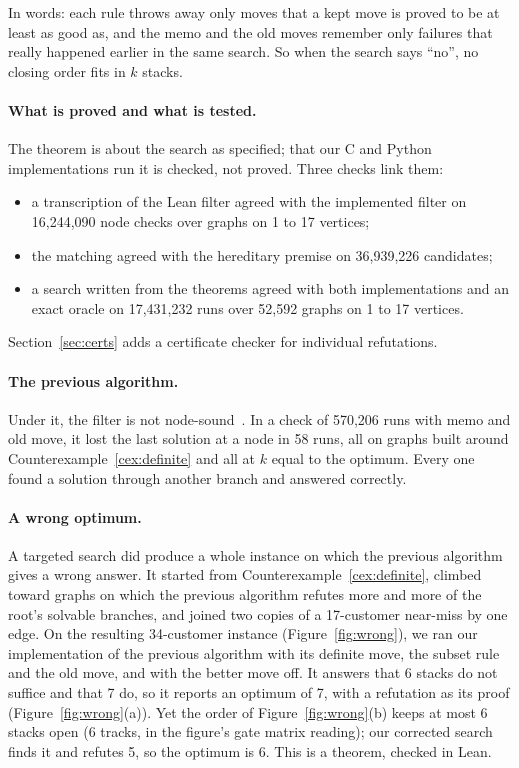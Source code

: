 In words: each rule throws away only moves that a kept move is proved to be at
least as good as, and the memo and the old moves remember only failures that
really happened earlier in the same search. So when the search says ``no'',
no closing order fits in $k$ stacks.

\paragraph{What is proved and what is tested.} The theorem is about the search
as specified; that our C and Python implementations run it is checked, not
proved. Three checks link them:
\begin{itemize}
\item a transcription of the Lean filter agreed with the implemented filter on
  16,244,090 node checks over graphs on 1 to 17 vertices;
\item the matching agreed with the hereditary premise on 36,939,226 candidates;
\item a search written from the theorems agreed with both implementations and
  an exact oracle on 17,431,232 runs over 52,592 graphs on 1 to 17 vertices.
\end{itemize}
Section~\ref{sec:certs} adds a certificate checker for individual
refutations.

\paragraph{The previous algorithm.} Under it, the filter is not
node-sound~. In a check of 570,206 runs with memo and old
move, it lost the last solution at a node in 58 runs, all on graphs built
around Counterexample~\ref{cex:definite} and all at $k$ equal to the optimum.
Every one found a solution through another branch and answered correctly.

\paragraph{A wrong optimum.} A targeted search did produce a whole instance on
which the previous algorithm \citep{ChuStuckey2009} gives a wrong answer. It started from
Counterexample~\ref{cex:definite}, climbed toward graphs on which the previous
algorithm refutes more and more of the root's solvable branches, and joined two
copies of a 17-customer near-miss by one edge. On the resulting 34-customer instance (Figure~\ref{fig:wrong}), we ran our
implementation of the previous algorithm with its definite move, the subset
rule and the old move, and with the better move off. It answers that 6 stacks
do not suffice and that 7 do, so it reports an optimum of 7, with a refutation
as its proof (Figure~\ref{fig:wrong}(a)). Yet the order of
Figure~\ref{fig:wrong}(b) keeps at most 6 stacks open (6 tracks, in the
figure's gate matrix reading); our corrected search finds it and
refutes 5, so the optimum is 6. This is a theorem, checked in Lean.

